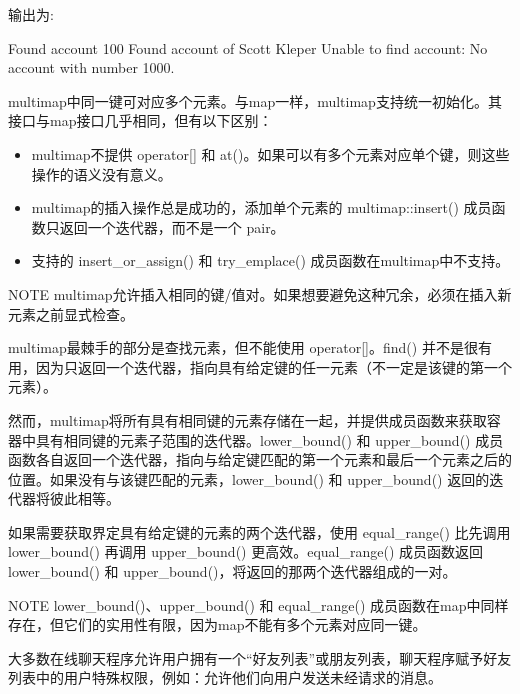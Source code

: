 输出为:

\begin{shell}
Found account 100
Found account of Scott Kleper
Unable to find account: No account with number 1000.
\end{shell}


multimap中同一键可对应多个元素。与map一样，multimap支持统一初始化。其接口与map接口几乎相同，但有以下区别：

\begin{itemize}
\item
multimap不提供 operator[] 和 at()。如果可以有多个元素对应单个键，则这些操作的语义没有意义。

\item
multimap的插入操作总是成功的，添加单个元素的 multimap::insert() 成员函数只返回一个迭代器，而不是一个 pair。

\item
支持的 insert\_or\_assign() 和 try\_emplace() 成员函数在multimap中不支持。
\end{itemize}

\begin{myNotic}{NOTE}
multimap允许插入相同的键/值对。如果想要避免这种冗余，必须在插入新元素之前显式检查。
\end{myNotic}

multimap最棘手的部分是查找元素，但不能使用 operator[]。find() 并不是很有用，因为只返回一个迭代器，指向具有给定键的任一元素（不一定是该键的第一个元素）。

然而，multimap将所有具有相同键的元素存储在一起，并提供成员函数来获取容器中具有相同键的元素子范围的迭代器。lower\_bound() 和 upper\_bound() 成员函数各自返回一个迭代器，指向与给定键匹配的第一个元素和最后一个元素之后的位置。如果没有与该键匹配的元素，lower\_bound() 和 upper\_bound() 返回的迭代器将彼此相等。

如果需要获取界定具有给定键的元素的两个迭代器，使用 equal\_range() 比先调用 lower\_bound() 再调用 upper\_bound() 更高效。equal\_range() 成员函数返回 lower\_bound() 和 upper\_bound()，将返回的那两个迭代器组成的一对。

\begin{myNotic}{NOTE}
lower\_bound()、upper\_bound() 和 equal\_range() 成员函数在map中同样存在，但它们的实用性有限，因为map不能有多个元素对应同一键。
\end{myNotic}


大多数在线聊天程序允许用户拥有一个“好友列表”或朋友列表，聊天程序赋予好友列表中的用户特殊权限，例如：允许他们向用户发送未经请求的消息。

